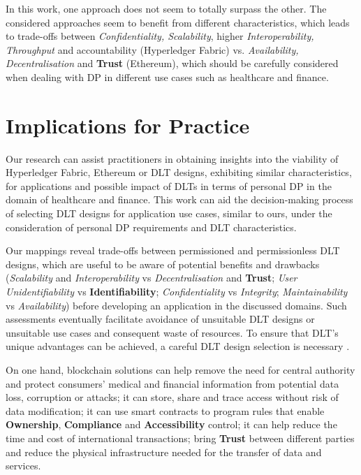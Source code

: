 In this work, one approach does not seem to totally surpass the other. The considered approaches seem to benefit from different characteristics, which leads to trade-offs between \textit{Confidentiality, Scalability}, higher \textit{Interoperability, Throughput} and accountability (Hyperledger Fabric) vs. \textit{Availability, Decentralisation} and \textbf{Trust} (Ethereum), which should be carefully considered when dealing with DP in different use cases such as healthcare and finance.

\section{Implications for Practice}
\label{sec:ImplicationsForPractice}

Our research can assist practitioners in obtaining insights into the viability of Hyperledger Fabric, Ethereum or DLT designs, exhibiting similar characteristics, for applications and possible impact of DLTs in terms of personal DP in the domain of healthcare and finance. This work can aid the decision-making process of selecting DLT designs for application use cases, similar to ours, under the consideration of personal DP requirements and DLT characteristics. 

Our mappings reveal trade-offs between permissioned and permissionless DLT designs, which are useful to be aware of potential benefits and drawbacks (\textit{Scalability} and \textit{Interoperability} vs \textit{Decentralisation} and \textbf{Trust}; \textit{User Unidentifiability} vs \textbf{Identifiability}; \textit{Confidentiality} vs \textit{Integrity}; \textit{Maintainability} vs \textit{Availability}) before developing an application in the discussed domains. Such assessments eventually facilitate avoidance of unsuitable DLT designs or unsuitable use cases and consequent waste of resources. To ensure that DLT's unique advantages can be achieved, a careful DLT design selection is necessary \cite{dehling2019security,dlt_4}.

On one hand, blockchain solutions can help remove the need for central authority and protect consumers' medical and financial information from potential data loss, corruption or attacks; it can store, share and trace access without risk of data modification; it can use smart contracts to program rules that enable \textbf{Ownership}, \textbf{Compliance} and \textbf{Accessibility} control; it can help reduce the time and cost of international transactions; bring \textbf{Trust} between different parties and reduce the physical infrastructure needed for the transfer of data and services. 

